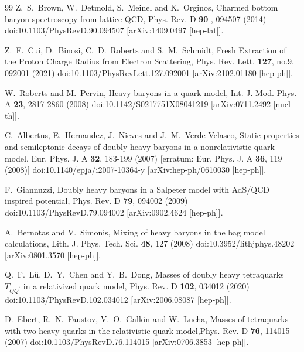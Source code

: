 \documentclass[12pt,onecolumn,floatfix,nofootinbib]{revtex4}
\begin{document}
\begin{thebibliography}{99}
 Z.~S.~Brown, W.~Detmold, S.~Meinel and K.~Orginos,
Charmed bottom baryon spectroscopy from lattice QCD, Phys. Rev. D \textbf{90}%
, 094507 (2014) doi:10.1103/PhysRevD.90.094507 [arXiv:1409.0497 [hep-lat]].

 Z.~F.~Cui, D.~Binosi, C.~D.~Roberts and S.~M.~Schmidt,
Fresh Extraction of the Proton Charge Radius from Electron Scattering,
Phys. Rev. Lett. \textbf{127}, no.9, 092001 (2021)
doi:10.1103/PhysRevLett.127.092001 [arXiv:2102.01180 [hep-ph]].

 W.~Roberts and M.~Pervin, Heavy baryons in a quark 
model, Int. J. Mod. Phys. A \textbf{23}, 2817-2860 (2008) 
doi:10.1142/S0217751X08041219 [arXiv:0711.2492 [nucl-th]].

 C.~Albertus, E.~Hernandez, J.~Nieves and 
J.~M.~Verde-Velasco, Static properties and semileptonic decays of doubly heavy 
baryons in a nonrelativistic quark model, Eur. Phys. J. A \textbf{32}, 
183-199 (2007) [erratum: Eur. Phys. J. A \textbf{36}, 119 (2008)]
doi:10.1140/epja/i2007-10364-y [arXiv:hep-ph/0610030 [hep-ph]].

 F.~Giannuzzi, Doubly heavy baryons in a Salpeter 
model with AdS/QCD inspired potential, Phys. Rev. D \textbf{79}, 094002 (2009) 
doi:10.1103/PhysRevD.79.094002 [arXiv:0902.4624 [hep-ph]].

 A.~Bernotas and V.~Simonis, Mixing of heavy baryons 
in the bag model calculations, Lith. J. Phys. Tech. Sci. \textbf{48}, 127 (2008)
doi:10.3952/lithjphys.48202 [arXiv:0801.3570 [hep-ph]].

 Q.~F.~L\"u, D.~Y.~Chen and Y.~B.~Dong, Masses of doubly
heavy tetraquarks $T_{QQ^\prime}$ in a relativized quark model, Phys. Rev. D
\textbf{102}, 034012 (2020) doi:10.1103/PhysRevD.102.034012
[arXiv:2006.08087 [hep-ph]].

 D.~Ebert, R.~N.~Faustov, V.~O.~Galkin and W.~Lucha,
Masses of tetraquarks with two heavy quarks in the relativistic quark
model,Phys. Rev. D \textbf{76}, 114015 (2007) doi:10.1103/PhysRevD.76.114015
[arXiv:0706.3853 [hep-ph]].



\end{thebibliography}
\end{document}

